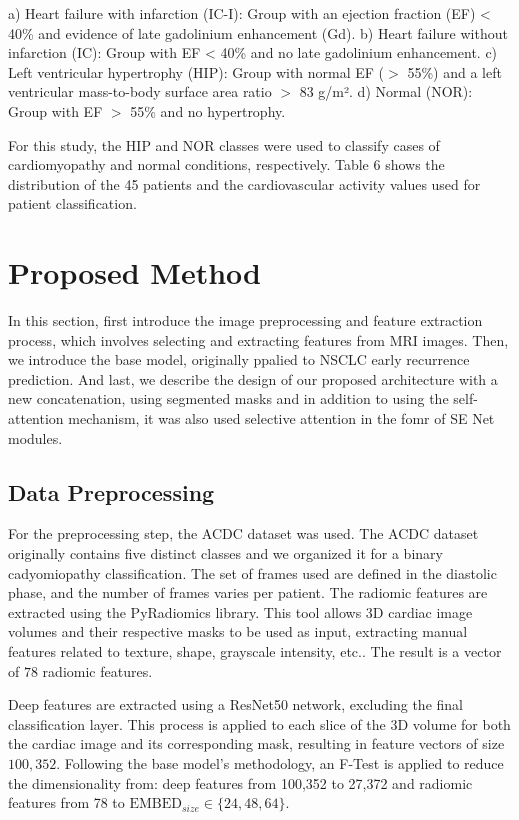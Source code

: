 \documentclass[journal,twoside,web]{ieeecolor}
\begin{document}
a) Heart failure with infarction (IC-I): Group with an ejection fraction (EF) < 40\% and evidence of late gadolinium enhancement (Gd).  
b) Heart failure without infarction (IC): Group with EF < 40\% and no late gadolinium enhancement.  
c) Left ventricular hypertrophy (HIP): Group with normal EF ($>$ 55\%) and a left ventricular mass-to-body surface area ratio $>$ 83 g/m².  
d) Normal (NOR): Group with EF $>$ 55\% and no hypertrophy.  

For this study, the HIP and NOR classes were used to classify cases of cardiomyopathy and normal conditions, respectively. Table 6 shows the distribution of the 45 patients and the cardiovascular activity values used for patient classification.

\section{Proposed Method}

In this section, first introduce the image preprocessing and feature extraction process, which involves selecting and extracting features from \gls{MRI} images. Then, we introduce the base model, originally ppalied to \gls{NSCLC} early recurrence prediction. And last, we describe the design of our proposed architecture with a new concatenation, using segmented masks and in addition to using the self-attention mechanism, it was also used selective attention in the fomr of SE Net modules.

\subsection{Data Preprocessing}

For the preprocessing step, the ACDC dataset was used. The ACDC dataset originally contains five distinct classes and we organized it for a binary cadyomiopathy classification. The set of frames used are defined in the diastolic phase, and the number of frames varies per patient. The radiomic features are extracted using the PyRadiomics library. This tool allows 3D cardiac image volumes and their respective masks to be used as input, extracting manual features related to texture, shape, grayscale intensity, etc.. The result is a vector of $78$ radiomic features.

Deep features are extracted using a ResNet50 network, excluding the final classification layer. This process is applied to each slice of the 3D volume for both the cardiac image and its corresponding mask, resulting in feature vectors of size $100,352$. Following the base model's methodology, an F-Test is applied to reduce the dimensionality from: deep features from 100,352 to 27,372 and radiomic features from 78 to $\text{EMBED}_{size} \in \{24, 48, 64\}$.
\end{document}
